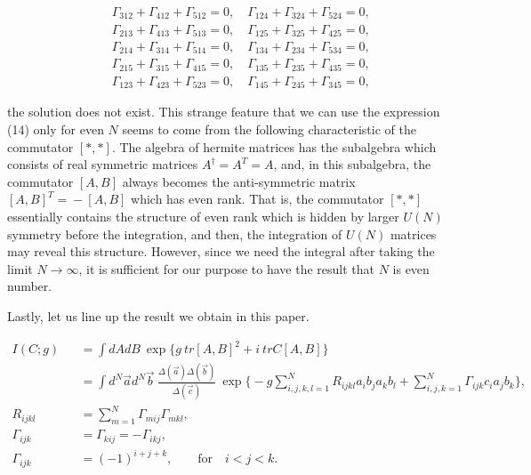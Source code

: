 \documentclass[a4paper,12pt]{article}
\begin{document}
\begin{eqnarray*}
	& & \Gamma_{312}+\Gamma_{412}+\Gamma_{512}=0,\quad 
	\Gamma_{124}+\Gamma_{324}+\Gamma_{524}=0, \\
	& & \Gamma_{213}+\Gamma_{413}+\Gamma_{513}=0,\quad 
	\Gamma_{125}+\Gamma_{325}+\Gamma_{425}=0, \\
	& & \Gamma_{214}+\Gamma_{314}+\Gamma_{514}=0,\quad 
	\Gamma_{134}+\Gamma_{234}+\Gamma_{534}=0, \\
	& & \Gamma_{215}+\Gamma_{315}+\Gamma_{415}=0,\quad 
	\Gamma_{135}+\Gamma_{235}+\Gamma_{435}=0, \\
	& & \Gamma_{123}+\Gamma_{423}+\Gamma_{523}=0,\quad 
	\Gamma_{145}+\Gamma_{245}+\Gamma_{345}=0,
\end{eqnarray*}

\noindent the solution does not exist. This strange feature that we can use the expression (14) only for even $N$ seems to come from the following characteristic of the commutator $[\ast ,\ast ]$. The algebra of hermite matrices has the subalgebra which consists of real symmetric matrices $A^{\dagger}\! =\! A^T\! =\! A$, and, in this subalgebra, the commutator $[A,B]$ always becomes the anti-symmetric matrix $[A,B]^{T}\! =\! -[A,B]$ which has even rank. That is, the commutator $[\ast ,\ast ]$ essentially contains the structure of even rank which is hidden by larger $U(N)$ symmetry before the integration, and then, the integration of $U(N)$ matrices may reveal this structure. However, since we need the integral after taking the limit $N\! \to \! \infty$, it is sufficient for our purpose to have the result that $N$ is even number.

Lastly, let us line up the result we obtain in this paper.

\begin{eqnarray*}
	I(C;g) \! \! \! \! \! \! \! \! 
	& & =\int dAdB \> \exp \Big\{ g\> tr[A,B]^2+i\> trC[A,B] \Big\} 
	\nonumber \\
	& & =\int d^N\vec{a} d^N\vec{b} \> 
	\frac{\Delta (\vec{a})\Delta (\vec{b})}{\Delta(\vec{c})} \> \exp 
	\Big\{ -g\sum_{i,j,k,l=1}^N R_{ijkl} a_ib_ja_kb_l +\sum_{i,j,k=1}^N 
	\Gamma_{ijk} c_ia_jb_k \Big\}, \\
	R_{ijkl} \! \! \! \! \! \! \! \! 
	& & =\sum_{m=1}^N \Gamma_{mij}\Gamma_{mkl}, \\
	\Gamma_{ijk} \! \! \! \! \! \! \! \! 
	& & =\Gamma_{kij}=-\Gamma_{ikj}, \\
	\Gamma_{ijk} \! \! \! \! \! \! \! \! 
	& & =(-1)^{i+j+k}, \qquad \text{for} \quad i<j<k.
\end{eqnarray*}
\end{document}
